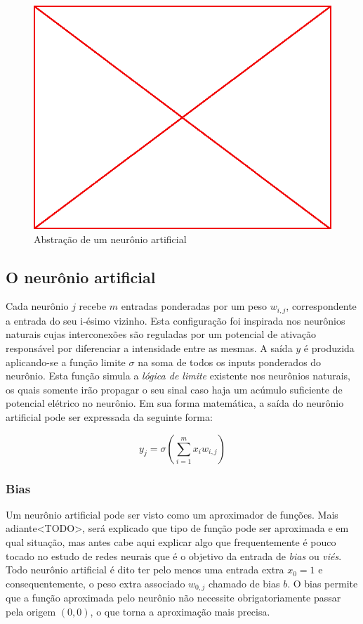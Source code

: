 \begin{figure}
  \caption{Abstração de um neurônio artificial}
  \begin{center}
    \includegraphics[scale=0.5]{placeholder}
  \end{center}
\end{figure}

\subsection{O neurônio artificial}

Cada neurônio $j$ recebe $m$ entradas ponderadas por um peso $w_{i,j}$,
correspondente a entrada do seu i-ésimo vizinho. Esta configuração foi
inspirada nos neurônios naturais cujas interconexões são reguladas por um
potencial de ativação responsável por diferenciar a intensidade entre as
mesmas. A saída $y$ é produzida aplicando-se a função limite $\sigma$ na soma
de todos os inputs ponderados do neurônio. Esta função simula a \emph{lógica de
  limite} existente nos neurônios naturais, os quais somente irão propagar o
seu sinal caso haja um acúmulo suficiente de potencial elétrico no neurônio. Em
sua forma matemática, a saída do neurônio artificial pode ser expressada da
seguinte forma:

$$y_j=\sigma(\sum_{i=1}^{m}x_i w_{i,j})$$

\subsubsection{Bias}

Um neurônio artificial pode ser visto como um aproximador de funções. Mais
adiante<TODO>, será explicado que tipo de função pode ser aproximada e em qual
situação, mas antes cabe aqui explicar algo que frequentemente é pouco tocado
no estudo de redes neurais que é o objetivo da entrada de \emph{bias} ou
\emph{viés}. Todo neurônio artificial é dito ter pelo menos uma entrada extra
$x_0 = 1$ e consequentemente, o peso extra associado $w_{0,j}$ chamado de bias
$b$. O bias permite que a função aproximada pelo neurônio não necessite
obrigatoriamente passar pela origem $(0,0)$, o que torna a aproximação mais
precisa.

